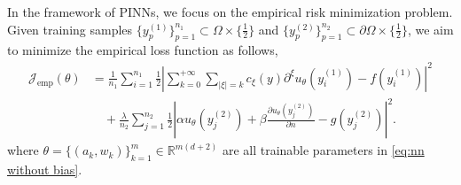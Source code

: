 \documentclass{article}
\begin{document}
In the framework of PINNs, we focus on the empirical risk minimization problem. 
Given training samples $\{y_{p}^{(1)}\}_{p=1}^{n_1}\subset \Omega \times \{\frac{1}{2}\}$ and  $\{y_{p}^{(2)}\}_{p=1}^{n_2}\subset \partial\Omega \times \{\frac{1}{2}\}$, we aim to minimize the empirical loss function as follows,
\begin{equation}
    \begin{aligned}
\mathcal{J}_{\text{emp}}(\theta) &= \frac{1}{n_1} \sum_{i=1}^{n_1}\frac{1}{2} \left|\sum_{k=0}^{+\infty} \sum_{|\xi|=k} c_{\xi}(y) \partial^\xi u_\theta\left(y_i^{(1)}\right) - f\left(y_i^{(1)}\right)\right|^2 \\
&\quad  + \frac{\lambda}{n_2} \sum_{j=1}^{n_2}\frac{1}{2} \left|\alpha u_\theta\left(y_j^{(2)}\right)+\beta \frac{\partial u_\theta\left(y_j^{(2)}\right)}{\partial n} - g\left(y_j^{(2)}\right)\right|^2.  \label{eq:emp_y}
    \end{aligned}
\end{equation}
where $\theta=\{(a_k,w_k)\}_{k=1}^{m}\in \mathbb{R}^{m(d+2)}$ are all trainable parameters in \cref{eq:nn without bias}.
\end{document}

